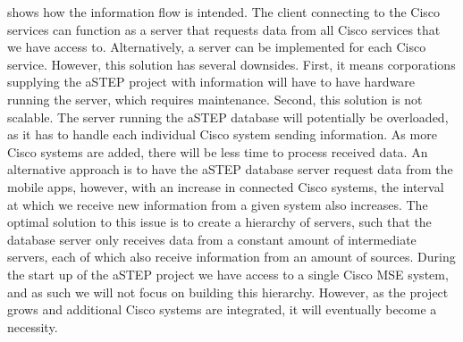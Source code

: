  shows how the information flow is intended. The client connecting to the Cisco services can function as a server that requests data from all Cisco services that we have access to. Alternatively, a server can be implemented for each Cisco service. However, this solution has several downsides. First, it means corporations supplying the aSTEP project with information will have to have hardware running the server, which requires maintenance. Second, this solution is not scalable. The server running the aSTEP database will potentially be overloaded, as it has to handle each individual Cisco system sending information. As more Cisco systems are added, there will be less time to process received data. An alternative approach is to have the aSTEP database server request data from the mobile apps, however, with an increase in connected Cisco systems, the interval at which we receive new information from a given system also increases. The optimal solution to this issue is to create a hierarchy of servers, such that the database server only receives data from a constant amount of intermediate servers, each of which also receive information from an amount of sources. During the start up of the aSTEP project we have access to a single Cisco MSE system, and as such we will not focus on building this hierarchy. However, as the project grows and additional Cisco systems are integrated, it will eventually become a necessity.

 